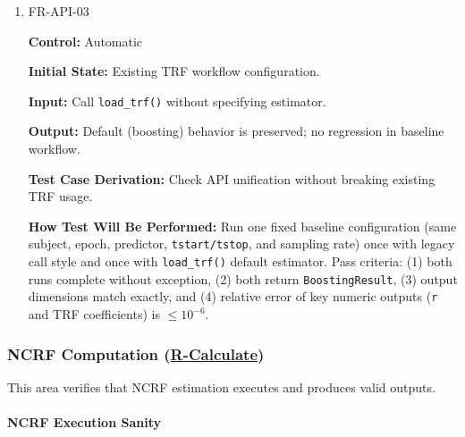\documentclass[12pt, titlepage]{article}
\begin{document}
\begin{enumerate}
\textbf{How Test Will Be Performed:} Invoke the call and verify the error message and exit behavior.

\item{FR-API-03\\}

\textbf{Control:} Automatic
					
\textbf{Initial State:} Existing TRF workflow configuration.
					
\textbf{Input:} Call \texttt{load\_trf()} without specifying estimator.
					
\textbf{Output:} Default (boosting) behavior is preserved; no regression in baseline workflow.

\textbf{Test Case Derivation:} Check API unification without breaking existing TRF usage.

\textbf{How Test Will Be Performed:} Run one fixed baseline configuration (same subject, epoch, predictor, \texttt{tstart/tstop}, and sampling rate) once with legacy call style and once with \texttt{load\_trf()} default estimator. Pass criteria: (1) both runs complete without exception, (2) both return \texttt{BoostingResult}, (3) output dimensions match exactly, and (4) relative error of key numeric outputs (\texttt{r} and TRF coefficients) is $\leq 10^{-6}$.

\end{enumerate}

\subsubsection{NCRF Computation (\hyperref[R-Calculate]{R-Calculate})}
This area verifies that NCRF estimation executes and produces valid outputs.

\paragraph{NCRF Execution Sanity}
\end{document}
